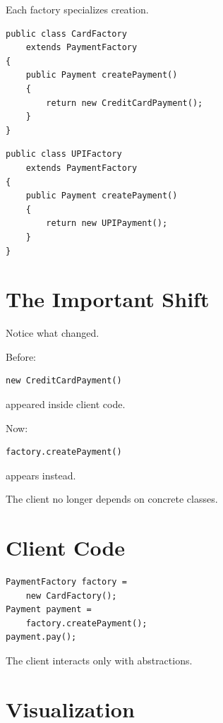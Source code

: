 \documentclass[11pt,a4paper]{book}
\begin{document}
Each factory specializes creation.

\begin{verbatim}
public class CardFactory
    extends PaymentFactory
{
    public Payment createPayment()
    {
        return new CreditCardPayment();
    }
}
\end{verbatim}

\begin{verbatim}
public class UPIFactory
    extends PaymentFactory
{
    public Payment createPayment()
    {
        return new UPIPayment();
    }
}
\end{verbatim}


\section{The Important Shift}

Notice what changed.

Before:

\begin{verbatim}
new CreditCardPayment()
\end{verbatim}

appeared inside client code.

Now:

\begin{verbatim}
factory.createPayment()
\end{verbatim}

appears instead.

The client no longer depends on concrete classes.


\section{Client Code}

\begin{verbatim}
PaymentFactory factory =
    new CardFactory();
Payment payment =
    factory.createPayment();
payment.pay();
\end{verbatim}

The client interacts only with abstractions.


\section{Visualization}
\end{document}
